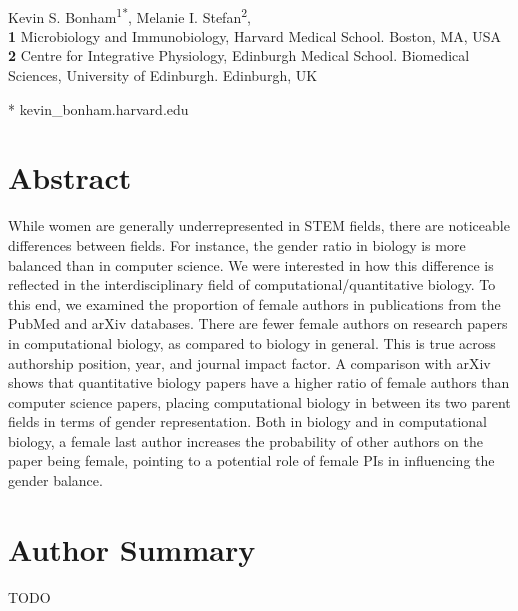 \documentclass[10pt,letterpaper]{article}
\date{}
\begin{document}
\vspace*{0.2in}
\linenumbers
\begin{flushleft}
{\Large
\textbf{}
}
\newline
\\
Kevin S. Bonham\textsuperscript{1*},
Melanie I. Stefan\textsuperscript{2},
\\
\bigskip
\textbf{1} Microbiology and Immunobiology, Harvard Medical School. Boston, MA, USA
\\
\textbf{2} {Centre for Integrative Physiology, Edinburgh Medical School. Biomedical Sciences, University of Edinburgh. Edinburgh, UK}
\\
\bigskip

* kevin\_bonham\@hms.harvard.edu

\section*{Abstract}
While women are generally underrepresented in STEM fields, there are noticeable differences between fields. For instance, the gender ratio in biology is more balanced than in computer science. We were interested in how this difference is reflected in the interdisciplinary field of computational/quantitative biology. To this end, we examined the proportion of female authors in publications from the PubMed and arXiv databases. There are fewer female authors on research papers in computational biology, as compared to biology in general. This is true across authorship position, year, and journal impact factor. A comparison with arXiv shows that quantitative biology papers have a higher ratio of female authors than computer science papers, placing computational biology in between its two parent fields in terms of gender representation. Both in biology and in computational biology, a female last author increases the probability of other authors on the paper being female, pointing to a potential role of female PIs in influencing the gender balance.

\section*{Author Summary}
TODO


\end{flushleft}
\end{document}

